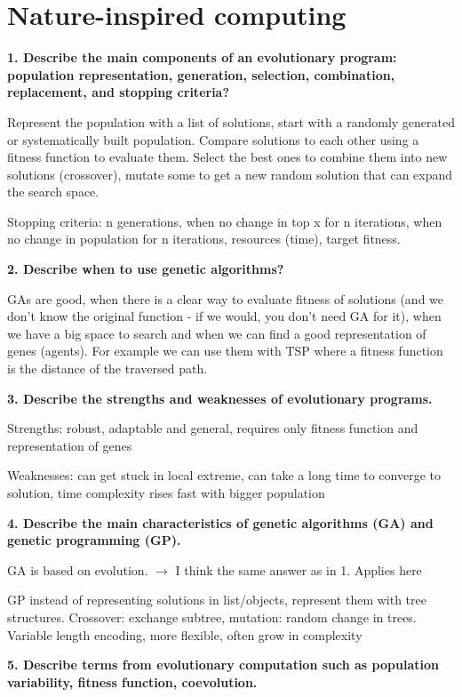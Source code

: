 \section{Nature-inspired computing}

\textbf{1. Describe the main components of an evolutionary program:
population representation, generation, selection, combination,
replacement, and stopping criteria?}

Represent the population with a list of solutions, start with a randomly
generated or systematically built population. Compare solutions to each
other using a fitness function to evaluate them. Select the best ones to
combine them into new solutions (crossover), mutate some to get a new
random solution that can expand the search space.

Stopping criteria: n generations, when no change in top x for n
iterations, when no change in population for n iterations, resources
(time), target fitness.


\textbf{2. Describe when to use genetic algorithms?}

GAs are good, when there is a clear way to evaluate fitness of solutions
(and we don't know the original function - if we would, you don't need
GA for it), when we have a big space to search and when we can find a
good representation of genes (agents). For example we can use them with
TSP where a fitness function is the distance of the traversed path.

\textbf{3. Describe the strengths and weaknesses of evolutionary
programs.}

Strengths: robust, adaptable and general, requires only fitness function
and representation of genes

Weaknesses: can get stuck in local extreme, can take a long time to
converge to solution, time complexity rises fast with bigger population

\textbf{4. Describe the main characteristics of genetic algorithms (GA)
and genetic programming (GP).}

GA is based on evolution. $\rightarrow$ I think the same answer as in
1. Applies here

GP instead of representing solutions in list/objects, represent them
with tree structures. Crossover: exchange subtree, mutation: random
change in trees. Variable length encoding, more flexible, often grow in
complexity

\textbf{5. Describe terms from evolutionary computation such as
population variability, fitness function, coevolution.}

